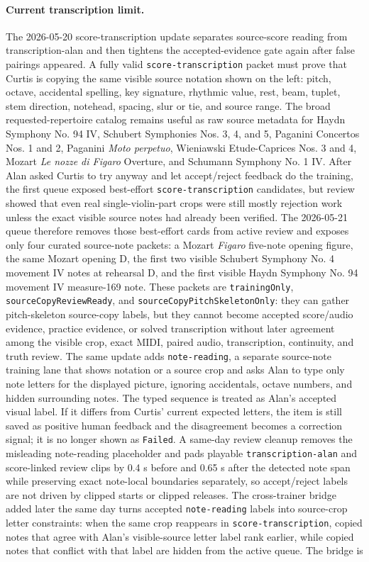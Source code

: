 \documentclass[12pt,letterpaper]{article}
\begin{document}
\paragraph*{Current transcription limit.}
The 2026-05-20 score-transcription update separates source-score reading from transcription-alan and then tightens the accepted-evidence gate again after false pairings appeared. A fully valid \texttt{score-transcription} packet must prove that Curtis is copying the same visible source notation shown on the left: pitch, octave, accidental spelling, key signature, rhythmic value, rest, beam, tuplet, stem direction, notehead, spacing, slur or tie, and source range. The broad requested-repertoire catalog remains useful as raw source metadata for Haydn Symphony No. 94 IV, Schubert Symphonies Nos. 3, 4, and 5, Paganini Concertos Nos. 1 and 2, Paganini \textit{Moto perpetuo}, Wieniawski Etude-Caprices Nos. 3 and 4, Mozart \textit{Le nozze di Figaro} Overture, and Schumann Symphony No. 1 IV. After Alan asked Curtis to try anyway and let accept/reject feedback do the training, the first queue exposed best-effort \texttt{score-transcription} candidates, but review showed that even real single-violin-part crops were still mostly rejection work unless the exact visible source notes had already been verified. The 2026-05-21 queue therefore removes those best-effort cards from active review and exposes only four curated source-note packets: a Mozart \textit{Figaro} five-note opening figure, the same Mozart opening D, the first two visible Schubert Symphony No. 4 movement IV notes at rehearsal D, and the first visible Haydn Symphony No. 94 movement IV measure-169 note. These packets are \texttt{trainingOnly}, \texttt{sourceCopyReviewReady}, and \texttt{sourceCopyPitchSkeletonOnly}: they can gather pitch-skeleton source-copy labels, but they cannot become accepted score/audio evidence, practice evidence, or solved transcription without later agreement among the visible crop, exact MIDI, paired audio, transcription, continuity, and truth review. The same update adds \texttt{note-reading}, a separate source-note training lane that shows notation or a source crop and asks Alan to type only note letters for the displayed picture, ignoring accidentals, octave numbers, and hidden surrounding notes. The typed sequence is treated as Alan's accepted visual label. If it differs from Curtis' current expected letters, the item is still saved as positive human feedback and the disagreement becomes a correction signal; it is no longer shown as \texttt{Failed}. A same-day review cleanup removes the misleading note-reading placeholder and pads playable \texttt{transcription-alan} and score-linked review clips by 0.4 s before and 0.65 s after the detected note span while preserving exact note-local boundaries separately, so accept/reject labels are not driven by clipped starts or clipped releases. The cross-trainer bridge added later the same day turns accepted \texttt{note-reading} labels into source-crop letter constraints: when the same crop reappears in \texttt{score-transcription}, copied notes that agree with Alan's visible-source letter label rank earlier, while copied notes that conflict with that label are hidden from the active queue. The bridge is 
\end{document}
